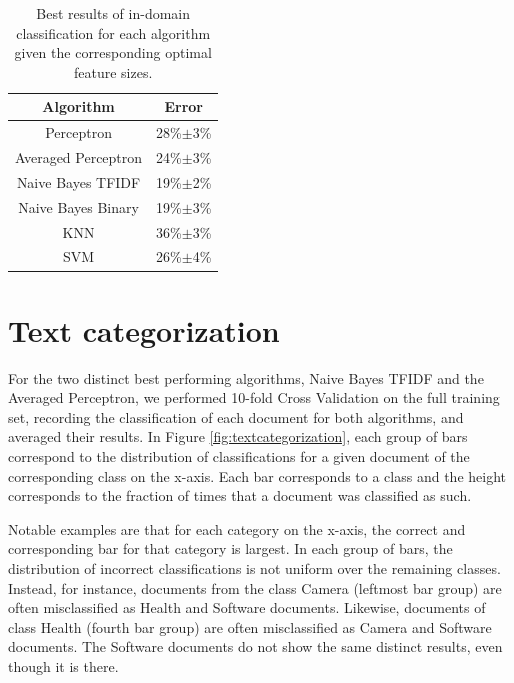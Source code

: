 \begin{table}[h!]
	\centering
	\begin{tabular}{ | c | c | } \hline
	\textbf{Algorithm} & \textbf{Error} \\ \hline
	Perceptron & 28\%$\pm$3\% \\ \hline
	Averaged Perceptron & 24\%$\pm$3\% \\ \hline
	Naive Bayes TFIDF & 19\%$\pm$2\% \\ \hline
	Naive Bayes Binary & 19\%$\pm$3\% \\ \hline
	KNN & 36\%$\pm$3\% \\ \hline
	SVM & 26\%$\pm$4\% \\ \hline
	\end{tabular}
	\caption{Best results of in-domain classification for each algorithm given the corresponding optimal feature sizes.}
	\label{tab:algorithm_best_performance}
\end{table}
\section{Text categorization}

For the two distinct best performing algorithms, Naive Bayes TFIDF and the Averaged Perceptron, we performed 10-fold Cross Validation on the full training set, recording the classification of each document for both algorithms, and averaged their results. In Figure \ref{fig:textcategorization}, each group of bars correspond to the distribution of classifications for a given document of the corresponding class on the x-axis. Each bar corresponds to a class and the height corresponds to the fraction of times that a document was classified as such.

Notable examples are that for each category on the x-axis, the correct and corresponding bar for that category is largest. In each group of bars, the distribution of incorrect classifications is not uniform over the remaining classes. Instead, for instance, documents from the class Camera (leftmost bar group) are often misclassified as Health and Software documents. Likewise, documents of class Health (fourth bar group) are often misclassified as Camera and Software documents. The Software documents do not show the same distinct results, even though it is there.

